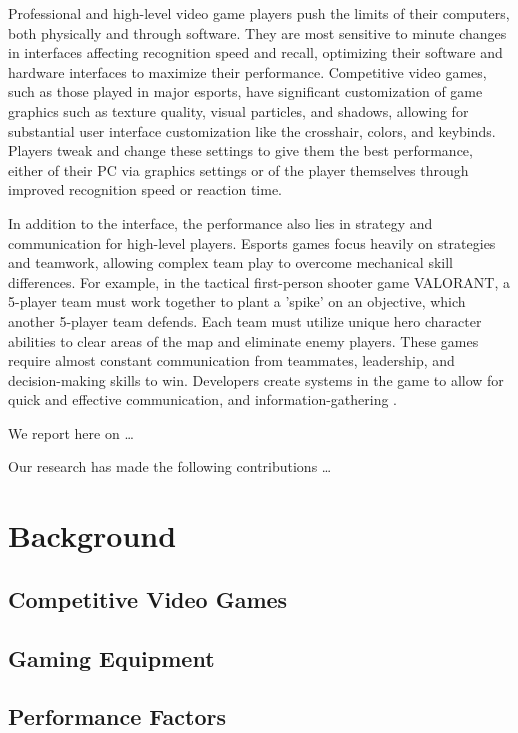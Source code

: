 \documentclass[sigconf]{acmart}
\begin{document}
Professional and high-level video game players push the limits of their computers, both physically and through software. They are most sensitive to minute changes in interfaces affecting recognition speed and recall, optimizing their software and hardware interfaces to maximize their performance. Competitive video games, such as those played in major esports, have significant customization of game graphics such as texture quality, visual particles, and shadows, allowing for substantial user interface customization like the crosshair, colors, and keybinds. Players tweak and change these settings to give them the best performance, either of their PC via graphics settings or of the player themselves through improved recognition speed or reaction time. 

In addition to the interface, the performance also lies in strategy and communication for high-level players. Esports games focus heavily on strategies and teamwork, allowing complex team play to overcome mechanical skill differences. For example, in the tactical first-person shooter game VALORANT, a 5-player team must work together to plant a 'spike' on an objective, which another 5-player team defends. Each team must utilize unique hero character abilities to clear areas of the map and eliminate enemy players. These games require almost constant communication from teammates, leadership, and decision-making skills to win. Developers create systems in the game to allow for quick and effective communication, and information-gathering \cite{Alharthi2018}. 

We report here on \dots

Our research has made the following contributions \dots

\section{Background}

\subsection{Competitive Video Games}
\subsection{Gaming Equipment}
\subsection{Performance Factors}
\end{document}
